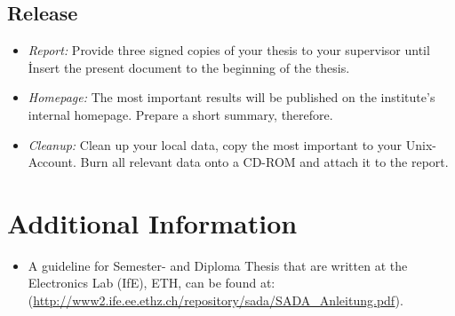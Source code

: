  \subsection*{Release}
 \begin{itemize}
  \item
   \emph{Report:} Provide three signed copies of your thesis to your supervisor until \AbgabeDatum \. Insert the present document to the beginning of the thesis.
  \item
   \emph{Homepage:} The most important results will be published on the institute's internal homepage. Prepare a short summary, therefore. 
  \item 
   \emph{Cleanup:} Clean up your local data, copy the most important to your Unix-Account. Burn all relevant data onto a CD-ROM and attach it to the report.
 \end{itemize}

\section*{Additional Information}
 \begin{itemize}
  \item
   A guideline for Semester- and Diploma Thesis that are written at the Electronics Lab (IfE), ETH, can be found at: (\url{http://www2.ife.ee.ethz.ch/repository/sada/SADA_Anleitung.pdf}).
 \end{itemize}

\dateandsignature 

\vspace{4cm}

\pagebreak


